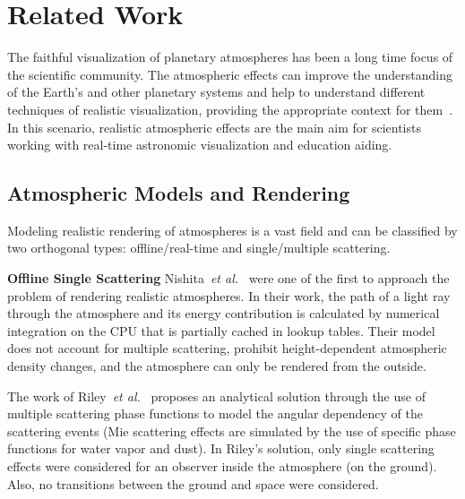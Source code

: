 \documentclass[journal]{vgtc}                %
\newcommand{\anderscomment}[1]{\textbf{[AY~} \textcolor{cyan}{#1} \textbf{~]}}
\newcommand{\etal}{\emph{et al.}}
\newcommand{\review}[1]{{\color{blue}#1}}
\begin{document}

\section{Related Work}


The faithful visualization of planetary atmospheres has been a long time focus of the scientific community. \review{The atmospheric effects can improve the understanding of the Earth's and other planetary systems and help to understand different techniques of realistic visualization, providing the appropriate context for them~\cite{vis17-bladin-globe-browsing}.} In this scenario, realistic atmospheric effects are the main aim for scientists working with real-time astronomic visualization and education aiding. 


\subsection{Atmospheric Models and Rendering}

\review{Modeling} realistic rendering of atmospheres is a vast field and can be classified by two orthogonal types: offline/real-time and single/multiple scattering.



\noindent \textbf{Offline Single Scattering} \quad Nishita~\etal~\cite{Nishita:1993} were one of the first to approach the problem of rendering realistic atmospheres. In their work, the path of a light ray through the atmosphere and its energy contribution is calculated by numerical integration on the CPU that \review{is} partially cached in lookup tables. Their model does not account for multiple scattering, prohibit height-dependent atmospheric density changes, and the atmosphere can only be rendered from the outside.

The work of Riley~\etal~\cite{Riley:2004} proposes an analytical solution through the use of multiple scattering phase functions to model the angular dependency of the scattering events (Mie scattering effects are simulated by the use of specific phase functions for water vapor and dust). \review{In Riley's solution, only single scattering effects were considered for an observer inside the atmosphere (on the ground). Also, no transitions between the ground and space were considered.}
\end{document}
